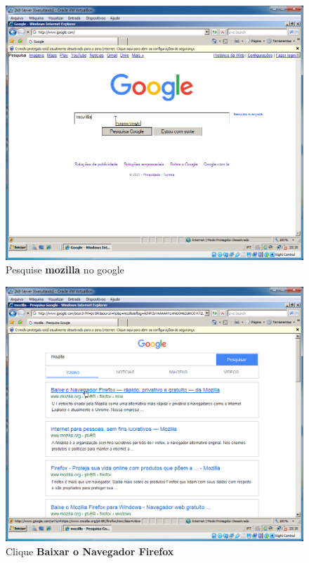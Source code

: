 \documentclass[10pt]{article}
\begin{document}
\begin{figure}[H]
    \centering
    \caption{Pesquise \textbf{mozilla} no google}
    \label{fig:re046}
    \includegraphics[width=\linewidth]{images/rede_externa/re046.png}
\end{figure}
\begin{figure}[H]
    \centering
    \caption{Clique \textbf{Baixar o Navegador Firefox}}
    \label{fig:re047}
    \includegraphics[width=\linewidth]{images/rede_externa/re047.png}
\end{figure}
\end{document}
